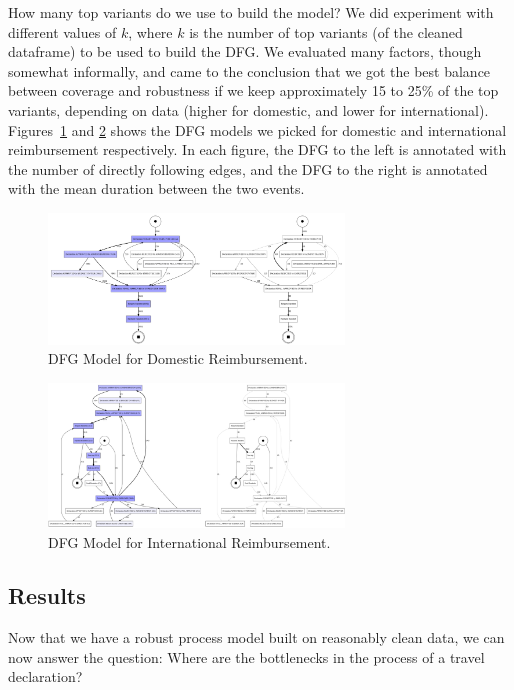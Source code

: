 \documentclass[conference]{IEEEtran}
\begin{document}
How many top variants do we use to build the model?
We did experiment with different values of $k$, where $k$ is the number of
top variants (of the cleaned dataframe) to be used to build the DFG. We
evaluated many factors, though somewhat informally, and came to the conclusion
that we got the best balance between coverage and robustness if
we keep approximately 15 to 25\% of the top variants, depending on data
(higher for domestic, and lower for international). Figures~\ref{fig-domestic}
and \ref{fig-international} shows the DFG models we picked for
domestic and international reimbursement respectively. In each figure,
the DFG to the left is annotated with the number of directly following
edges, and the DFG to the right is annotated with the mean duration between
the two events.

\begin{figure}[htbp]
\centerline{\includegraphics[width=0.70\textwidth]{images/domestic.png}}
\caption{DFG Model for Domestic Reimbursement.}
\label{fig-domestic}
\end{figure}

\begin{figure}[htbp]
\centerline{\includegraphics[width=0.70\textwidth]{images/international.png}}
\caption{DFG Model for International Reimbursement.}
\label{fig-international}
\end{figure}


\subsection{Results}

Now that we have a robust process model built on reasonably clean data,
we can now answer the question: 
Where are the bottlenecks in the process of a travel declaration?
\end{document}
